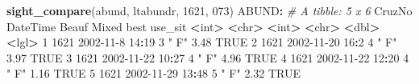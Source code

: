 \documentclass[
]{book}
\newenvironment{Shaded}{\begin{snugshade}}{\end{snugshade}}
\newcommand{\CommentTok}[1]{\textcolor[rgb]{0.56,0.35,0.01}{\textit{#1}}}
\newcommand{\ConstantTok}[1]{\textcolor[rgb]{0.56,0.35,0.01}{#1}}
\newcommand{\DecValTok}[1]{\textcolor[rgb]{0.00,0.00,0.81}{#1}}
\newcommand{\ErrorTok}[1]{\textcolor[rgb]{0.64,0.00,0.00}{\textbf{#1}}}
\newcommand{\FloatTok}[1]{\textcolor[rgb]{0.00,0.00,0.81}{#1}}
\newcommand{\FunctionTok}[1]{\textcolor[rgb]{0.13,0.29,0.53}{\textbf{#1}}}
\newcommand{\NormalTok}[1]{#1}
\newcommand{\SpecialCharTok}[1]{\textcolor[rgb]{0.81,0.36,0.00}{\textbf{#1}}}
\newcommand{\StringTok}[1]{\textcolor[rgb]{0.31,0.60,0.02}{#1}}
\begin{document}
\begin{Shaded}
\begin{Highlighting}[]
\FunctionTok{sight\_compare}\NormalTok{(abund, ltabundr, }\DecValTok{1621}\NormalTok{, }\StringTok{\textquotesingle{}073\textquotesingle{}}\NormalTok{)}
\NormalTok{ABUND}\SpecialCharTok{:}
\CommentTok{\# A tibble: 5 x 6}
\NormalTok{  CruzNo DateTime         Beauf Mixed  best use\_sit}
   \SpecialCharTok{\textless{}}\NormalTok{int}\SpecialCharTok{\textgreater{}} \ErrorTok{\textless{}}\NormalTok{chr}\SpecialCharTok{\textgreater{}}            \ErrorTok{\textless{}}\NormalTok{int}\SpecialCharTok{\textgreater{}} \ErrorTok{\textless{}}\NormalTok{chr}\SpecialCharTok{\textgreater{}} \ErrorTok{\textless{}}\NormalTok{dbl}\SpecialCharTok{\textgreater{}} \ErrorTok{\textless{}}\NormalTok{lgl}\SpecialCharTok{\textgreater{}}  
\DecValTok{1}   \DecValTok{1621} \DecValTok{2002{-}11{-}8} \DecValTok{14}\SpecialCharTok{:}\DecValTok{19}      \DecValTok{3} \StringTok{" F"}   \FloatTok{3.48} \ConstantTok{TRUE}   
\DecValTok{2}   \DecValTok{1621} \DecValTok{2002{-}11{-}20} \DecValTok{16}\SpecialCharTok{:}\DecValTok{2}      \DecValTok{4} \StringTok{" F"}   \FloatTok{3.97} \ConstantTok{TRUE}   
\DecValTok{3}   \DecValTok{1621} \DecValTok{2002{-}11{-}22} \DecValTok{10}\SpecialCharTok{:}\DecValTok{27}     \DecValTok{4} \StringTok{" F"}   \FloatTok{4.96} \ConstantTok{TRUE}   
\DecValTok{4}   \DecValTok{1621} \DecValTok{2002{-}11{-}22} \DecValTok{12}\SpecialCharTok{:}\DecValTok{20}     \DecValTok{4} \StringTok{" F"}   \FloatTok{1.16} \ConstantTok{TRUE}   
\DecValTok{5}   \DecValTok{1621} \DecValTok{2002{-}11{-}29} \DecValTok{13}\SpecialCharTok{:}\DecValTok{48}     \DecValTok{5} \StringTok{" F"}   \FloatTok{2.32} \ConstantTok{TRUE}   


\end{Highlighting}
\end{Shaded}
\end{document}
